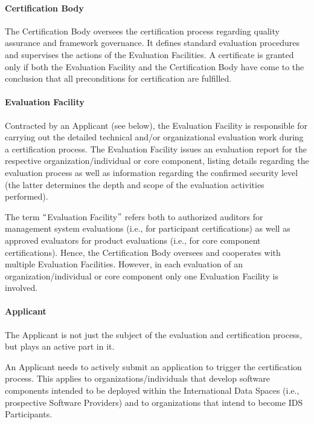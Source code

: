 


\paragraph{Certification Body \\}
The Certification Body oversees the certification process regarding quality assurance and framework governance. It defines standard evaluation procedures and supervises the actions of the Evaluation Facilities. A certificate is granted only if both the Evaluation Facility and the Certification Body have come to the conclusion that all preconditions for certification are fulfilled.

\paragraph{Evaluation Facility \\}
Contracted by an Applicant (see below), the Evaluation Facility is responsible for carrying out the detailed technical and/or organizational evaluation work during a certification process. The Evaluation Facility issues an evaluation report for the respective organization/individual or core component, listing details regarding the evaluation process as well as information regarding the confirmed security level (the latter determines the depth and scope of the evaluation activities performed).

The term $``$Evaluation Facility$"$  refers both to authorized auditors for management system evaluations (i.e., for participant certifications) as well as approved evaluators for product evaluations (i.e., for core component certifications). Hence, the Certification Body oversees and cooperates with multiple Evaluation Facilities. However, in each evaluation of an organization/individual or core component only one Evaluation Facility is involved.

\paragraph{Applicant \\}
The Applicant is not just the subject of the evaluation and certification process, but plays an active part in it.

An Applicant needs to actively submit an application to trigger the certification process. This applies to organizations/individuals that develop software components intended to be deployed within the International Data Spaces (i.e., prospective Software Providers) and to organizations that intend to become IDS Participants.

